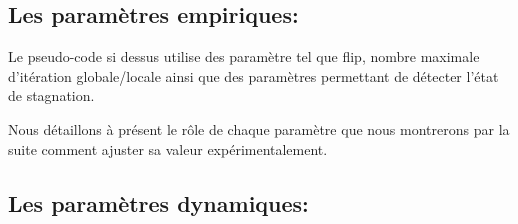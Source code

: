 	\subsection{Les paramètres empiriques:}
	Le pseudo-code si dessus utilise des paramètre tel que flip, nombre maximale d’itération globale/locale ainsi que des paramètres permettant de détecter l’état de stagnation.

Nous détaillons à présent le rôle de chaque paramètre que nous montrerons par la suite comment ajuster sa valeur expérimentalement.
	\subsection{Les paramètres dynamiques:}
